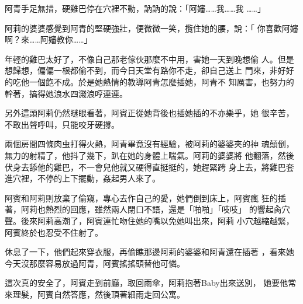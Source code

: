 阿青手足無措，硬雞巴停在穴裡不動，訥訥的說：「阿嬸……我……我
……」

阿莉的婆婆感覺到阿青的堅硬強壯，便微微一笑，攬住她的腰，說：「
你喜歡阿嬸啊？來……阿嬸教你……」

年輕的雞巴太好了，不像自己那老傢伙那麼不中用，害她一天到晚想偷
人。但是想歸想，偏偏一根都偷不到，而今日天堂有路你不走，卻自己送上
門來，非好好的吃他一個飽不成。於是她熱情的教導阿青怎麼插她，阿青不
知厲害，也努力的幹著，搞得她浪水四濺浪哼連連。

另外這頭阿莉仍然瞇眼看著，阿賓正從她背後也插她插的不亦樂乎，她
很辛苦，不敢出聲呼叫，只能咬牙硬撐。

兩個房間四條肉虫打得火熱，阿青畢竟沒有經驗，被阿莉的婆婆夾的神
魂顛倒，無力的射精了，他抖了幾下，趴在她的身體上喘氣。阿莉的婆婆將
他翻落，然後伏身去舔他的雞巴，不一會兒他就又硬得直挺挺的，她趕緊跨
身上去，將雞巴套進穴裡，不停的上下擺動，姦起男人來了。

阿賓和阿莉則放棄了偷窺，專心去作自己的愛，她們倒到床上，阿賓瘋
狂的插著，阿莉也熱烈的回應，雖然兩人閉口不語，還是「啪啪」「吱吱」
的響起肏穴聲。後來阿莉高潮了，阿賓連忙吻住她的嘴以免她叫出來，阿莉
小穴越縮越緊，阿賓終於也忍受不住射了。

休息了一下，他們起來穿衣服，再偷瞧那邊阿莉的婆婆和阿青還在插著
，看來她今天沒那麼容易放過阿青，阿賓搖搖頭替他可憐。

這次真的安全了，阿賓走到前廳，取回雨傘，阿莉抱著Baby出來送別，
她要他常來理髮，阿賓自然答應，然後頂著細雨走回公寓。










